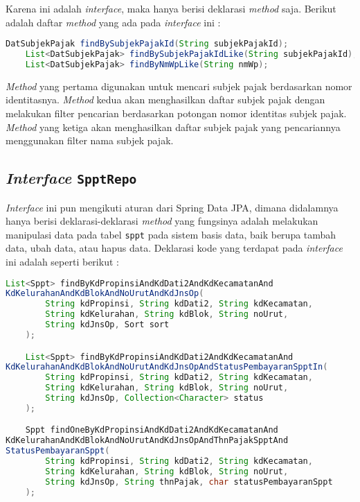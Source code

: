 \documentclass[pdftex,12pt, oneside]{article}
\begin{document}
Karena ini adalah \textit{interface}, maka hanya berisi deklarasi \textit{method} saja. Berikut adalah daftar \textit{method} yang ada pada \textit{interface} ini :

\begin{lstlisting}[language=java]
    DatSubjekPajak findBySubjekPajakId(String subjekPajakId);
    List<DatSubjekPajak> findBySubjekPajakIdLike(String subjekPajakId);
    List<DatSubjekPajak> findByNmWpLike(String nmWp);
\end{lstlisting}

\textit{Method} yang pertama digunakan untuk mencari subjek pajak berdasarkan nomor identitasnya. \textit{Method} kedua akan menghasilkan daftar subjek pajak dengan melakukan filter pencarian berdasarkan potongan nomor identitas subjek pajak. \textit{Method} yang ketiga akan menghasilkan daftar subjek pajak yang pencariannya menggunakan filter nama subjek pajak.

\subsection{\textit{Interface} \texttt{SpptRepo}}

\textit{Interface} ini pun mengikuti aturan dari Spring Data JPA, dimana didalamnya hanya berisi deklarasi-deklarasi \textit{method} yang fungsinya adalah melakukan manipulasi data pada tabel \texttt{sppt} pada sistem basis data, baik berupa tambah data, ubah data, atau hapus data. Deklarasi kode yang terdapat pada \textit{interface} ini adalah seperti berikut :

\begin{lstlisting}[language=java]
    List<Sppt> findByKdPropinsiAndKdDati2AndKdKecamatanAnd
KdKelurahanAndKdBlokAndNoUrutAndKdJnsOp(
        String kdPropinsi, String kdDati2, String kdKecamatan, 
        String kdKelurahan, String kdBlok, String noUrut, 
        String kdJnsOp, Sort sort
    );

    List<Sppt> findByKdPropinsiAndKdDati2AndKdKecamatanAnd
KdKelurahanAndKdBlokAndNoUrutAndKdJnsOpAndStatusPembayaranSpptIn(
        String kdPropinsi, String kdDati2, String kdKecamatan, 
        String kdKelurahan, String kdBlok, String noUrut, 
        String kdJnsOp, Collection<Character> status
    );

    Sppt findOneByKdPropinsiAndKdDati2AndKdKecamatanAnd
KdKelurahanAndKdBlokAndNoUrutAndKdJnsOpAndThnPajakSpptAnd
StatusPembayaranSppt(
        String kdPropinsi, String kdDati2, String kdKecamatan, 
        String kdKelurahan, String kdBlok, String noUrut,
        String kdJnsOp, String thnPajak, char statusPembayaranSppt
    );
\end{lstlisting}
\end{document}
